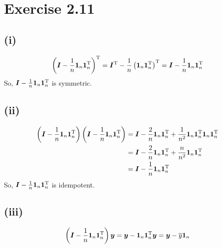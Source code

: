 \section*{Exercise 2.11}
\subsection*{(i)}
\begin{align*}
\left(\bm{I} -\frac{1}{n}\bm{1}_{n}\bm{1}_{n}^{\rm T}\right)^{\rm T} = \bm{I}^{\rm T} -\frac{1}{n}\left(\bm{1}_{n}\bm{1}_{n}^{\rm T}\right)^{\rm T} = \bm{I} -\frac{1}{n}\bm{1}_{n}\bm{1}_{n}^{\rm T}
\end{align*}
So, $\bm{I} -\frac{1}{n}\bm{1}_{n}\bm{1}_{n}^{\rm T}$ is symmetric.

\subsection*{(ii)}
\begin{align*}
\left(\bm{I} -\frac{1}{n}\bm{1}_{n}\bm{1}_{n}^{\rm T}\right)\left(\bm{I} -\frac{1}{n}\bm{1}_{n}\bm{1}_{n}^{\rm T}\right)
&= \bm{I} -\frac{2}{n}\bm{1}_{n}\bm{1}_{n}^{\rm T} +\frac{1}{n^2}\bm{1}_{n}\bm{1}_{n}^{\rm T}\bm{1}_{n}\bm{1}_{n}^{\rm T}\\
&= \bm{I} -\frac{2}{n}\bm{1}_{n}\bm{1}_{n}^{\rm T} +\frac{n}{n^2}\bm{1}_{n}\bm{1}_{n}^{\rm T}\\
&= \bm{I} -\frac{1}{n}\bm{1}_{n}\bm{1}_{n}^{\rm T}
\end{align*}
So, $\bm{I} -\frac{1}{n}\bm{1}_{n}\bm{1}_{n}^{\rm T}$ is idempotent.

\subsection*{(iii)}
\begin{align*}
\left(\bm{I} -\frac{1}{n}\bm{1}_{n}\bm{1}_{n}^{\rm T}\right)\bm{y}
= \bm{y} - \bm{1}_{n}\bm{1}_{n}^{\rm T}\bm{y}
= \bm{y} - \overline{y}\bm{1}_{n}
\end{align*}